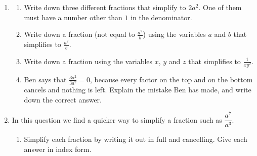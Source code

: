 \documentclass[12pt,a4paper]{article}
\begin{document}
\begin{enumerate}[resume]

\item
\begin{enumerate}
  \item Write down three different fractions that simplify to $2a^2$. One of
        them must have a number other than $1$ in the denominator.

\vspace{12pt}
\hfill {}\hfill
{}

\vspace{12pt}
  \item Write down a fraction (not equal to $\frac{a^2}{b}$) using the variables $a$ and $b$ that simplifies
        to $\frac{a^2}{b}$.

\vspace{16pt}


\vspace{8pt}
\item Write down a fraction using the variables $x$, $y$ and $z$ that simplifies to
      $\frac{1}{xy^2}$.

\vspace{16pt}


\vspace{8pt}
  \item Ben says that $\frac{3a^2}{3a^2}=0$, because every factor on the top
        and on the bottom cancels and nothing is left. Explain the mistake Ben
        has made, and write down the correct answer.

\vspace{6pt}

\vspace{16pt}
\end{enumerate}

\item In this question we find a quicker way to simplify a fraction such as
$\dfrac{a^7}{a^3}$.
\begin{enumerate}
  \item Simplify each fraction by writing it out in full and cancelling. Give
        each answer in index form.


\end{enumerate}
\end{enumerate}
\end{document}
